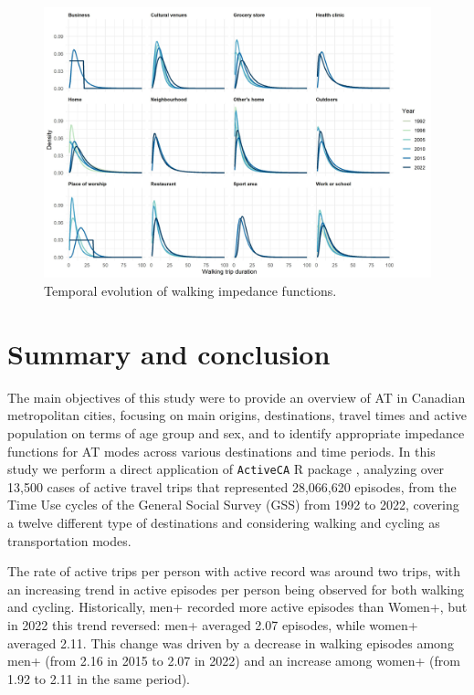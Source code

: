 \documentclass[preprint, 3p,
authoryear]{elsarticle} %
\begin{document}
\begin{figure}

{\centering \includegraphics[width=1\linewidth]{figures/walking_temporal_evolution} 

}

\caption{Temporal evolution of walking impedance functions.}\label{fig:walking-evolution-fig}
\end{figure}

\section{Summary and conclusion}\label{summary-and-conclusion}

The main objectives of this study were to provide an overview of AT in
Canadian metropolitan cities, focusing on main origins, destinations,
travel times and active population on terms of age group and sex, and to
identify appropriate impedance functions for AT modes across various
destinations and time periods. In this study we perform a direct
application of \texttt{ActiveCA} R package \citep{dossantos2025},
analyzing over 13,500 cases of active travel trips that represented
28,066,620 episodes, from the Time Use cycles of the General Social
Survey (GSS) from 1992 to 2022, covering a twelve different type of
destinations and considering walking and cycling as transportation
modes.

The rate of active trips per person with active record was around two
trips, with an increasing trend in active episodes per person being
observed for both walking and cycling. Historically, men+ recorded more
active episodes than Women+, but in 2022 this trend reversed: men+
averaged 2.07 episodes, while women+ averaged 2.11. This change was
driven by a decrease in walking episodes among men+ (from 2.16 in 2015
to 2.07 in 2022) and an increase among women+ (from 1.92 to 2.11 in the
same period).
\end{document}
